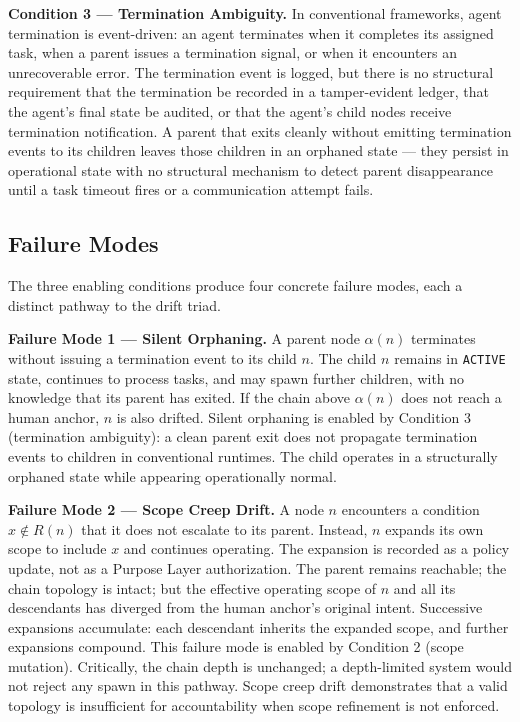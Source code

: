 \medskip
\noindent\textbf{Condition 3 — Termination Ambiguity.}
In conventional frameworks, agent termination is event-driven: an agent terminates when it completes its assigned task, when a parent issues a termination signal, or when it encounters an unrecoverable error. The termination event is logged, but there is no structural requirement that the termination be recorded in a tamper-evident ledger, that the agent's final state be audited, or that the agent's child nodes receive termination notification. A parent that exits cleanly without emitting termination events to its children leaves those children in an orphaned state — they persist in operational state with no structural mechanism to detect parent disappearance until a task timeout fires or a communication attempt fails.

\subsection{Failure Modes}
\label{sec:rs-drift-failure-modes}

The three enabling conditions produce four concrete failure modes, each a distinct pathway to the drift triad.

\medskip
\noindent\textbf{Failure Mode 1 — Silent Orphaning.}
A parent node $\alpha(n)$ terminates without issuing a termination event to its child $n$. The child $n$ remains in \texttt{ACTIVE} state, continues to process tasks, and may spawn further children, with no knowledge that its parent has exited. If the chain above $\alpha(n)$ does not reach a human anchor, $n$ is also drifted. Silent orphaning is enabled by Condition 3 (termination ambiguity): a clean parent exit does not propagate termination events to children in conventional runtimes. The child operates in a structurally orphaned state while appearing operationally normal.

\medskip
\noindent\textbf{Failure Mode 2 — Scope Creep Drift.}
A node $n$ encounters a condition $x \notin R(n)$ that it does not escalate to its parent. Instead, $n$ expands its own scope to include $x$ and continues operating. The expansion is recorded as a policy update, not as a Purpose Layer authorization. The parent remains reachable; the chain topology is intact; but the effective operating scope of $n$ and all its descendants has diverged from the human anchor's original intent. Successive expansions accumulate: each descendant inherits the expanded scope, and further expansions compound. This failure mode is enabled by Condition 2 (scope mutation). Critically, the chain depth is unchanged; a depth-limited system would not reject any spawn in this pathway. Scope creep drift demonstrates that a valid topology is insufficient for accountability when scope refinement is not enforced.

